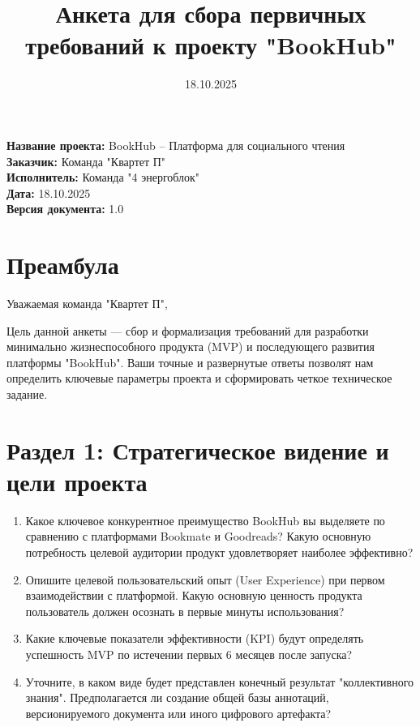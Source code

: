 \documentclass[12pt,a4paper]{article}
\title{\textbf{Анкета для сбора первичных требований к проекту "BookHub"}}
\author{}
\date{18.10.2025}
\begin{document}
\maketitle

\vspace{1cm}

\begin{center}
\textbf{Название проекта:} BookHub – Платформа для социального чтения \\
\textbf{Заказчик:} Команда "Квартет П" \\
\textbf{Исполнитель:} Команда "4 энергоблок" \\
\textbf{Дата:} 18.10.2025 \\
\textbf{Версия документа:} 1.0
\end{center}

\vspace{1cm}

\section*{Преамбула}

Уважаемая команда "Квартет П",

Цель данной анкеты — сбор и формализация требований для разработки минимально жизнеспособного продукта (MVP) и последующего развития платформы "BookHub". Ваши точные и развернутые ответы позволят нам определить ключевые параметры проекта и сформировать четкое техническое задание.

\vspace{1cm}

\section*{Раздел 1: Стратегическое видение и цели проекта}

\begin{enumerate}
    \item Какое ключевое конкурентное преимущество BookHub вы выделяете по сравнению с платформами Bookmate и Goodreads? Какую основную потребность целевой аудитории продукт удовлетворяет наиболее эффективно?
    
    \item Опишите целевой пользовательский опыт (User Experience) при первом взаимодействии с платформой. Какую основную ценность продукта пользователь должен осознать в первые минуты использования?
    
    \item Какие ключевые показатели эффективности (KPI) будут определять успешность MVP по истечении первых 6 месяцев после запуска?
    
    \item Уточните, в каком виде будет представлен конечный результат "коллективного знания". Предполагается ли создание общей базы аннотаций, версионируемого документа или иного цифрового артефакта?
\end{enumerate}
\end{document}
